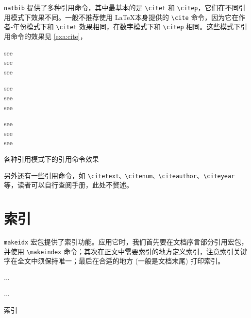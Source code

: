 \texttt{natbib} 提供了多种引用命令，其中最基本的是 \verb|\citet| 和 \verb|\citep|，它们在不同引用模式下效果不同。一般不推荐使用 \LaTeX 本身提供的 \verb|\cite| 命令，因为它在作者-年份模式下和 \verb|\citet| 效果相同，在数字模式下和 \verb|\citep| 相同。这些模式下引用命令的效果见 \autoref{exa:cite}，

\begin{example}[h]
\begin{RLDemo}[numbers=none]
see \cite{Daly_2010}\\
see \citet{Daly_2010}\\
see \citep{Daly_2010}
\end{RLDemo}

\begin{RLDemo}[numbers=none]
see \cite{Daly_2010}\\
see \citet{Daly_2010}\\
see \citep{Daly_2010}
\end{RLDemo}

\begin{RLDemo}[numbers=none]
see \cite{Daly_2010}\\
see \citet{Daly_2010}\\
see \citep{Daly_2010}
\end{RLDemo}
\caption{各种引用模式下的引用命令效果}
\label{exa:cite}
\end{example}

另外还有一些引用命令，如 \verb|\citetext、\citenum、\citeauthor|、\verb|\citeyear| 等，读者可以自行查阅手册，此处不赘述。

\section{索引}

\texttt{makeidx} 宏包提供了索引功能。应用它时，我们首先要在文档序言部分引用宏包，并使用 \verb|\makeindex| 命令；其次在正文中需要索引的地方定义索引，注意索引关键字在全文中须保持唯一；最后在合适的地方 (一般是文档末尾) 打印索引。

\begin{example}[h]
\begin{Code}[]
\usepackage{makeidx}
\makeindex
...

...
\printindex

\end{Code}
\caption{索引}
\label{exa:index}
\end{example}

